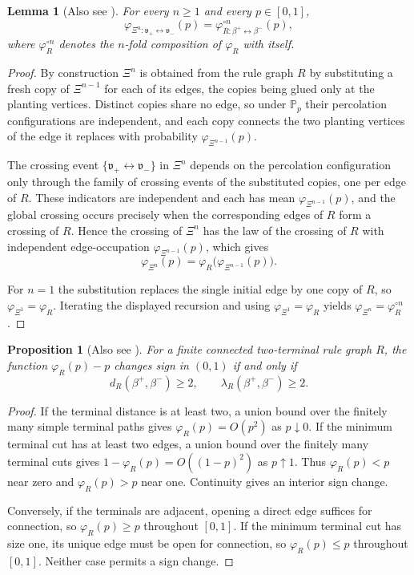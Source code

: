 \documentclass[scheme=plain,11pt]{ctexart}
\newtheorem{lemma}[theorem]{Lemma}
\newtheorem{proposition}[theorem]{Proposition}
\theoremstyle{definition}
\theoremstyle{remark}
\newcommand{\dist}{d}
\begin{document}
\begin{lemma}[Also see \cite{alves2026percolation}]\label{lem:renormalisation}
For every $n\ge 1$ and every $p\in[0,1]$,
\[
    \varphi_{\Xi^{n}:\mathfrak v_+\leftrightarrow \mathfrak v_-}(p)
    =
    \varphi_{R:\beta^+\leftrightarrow \beta^-}^{\circ n}(p),
\]
where $\varphi_R^{\circ n}$ denotes the $n$-fold composition of $\varphi_R$ with itself.
\end{lemma}
\begin{proof}
By construction $\Xi^{n}$ is obtained from the rule graph $R$ by substituting a fresh copy of $\Xi^{n-1}$ for each of its edges, the copies being glued only at the planting vertices.
Distinct copies share no edge, so under $\mathbb P_p$ their percolation configurations are independent, and each copy connects the two planting vertices of the edge it replaces with probability $\varphi_{\Xi^{n-1}}(p)$.

The crossing event $\{\mathfrak v_+\leftrightarrow\mathfrak v_-\}$ in $\Xi^{n}$ depends on the percolation configuration only through the family of crossing events of the substituted copies, one per edge of $R$.
These indicators are independent and each has mean $\varphi_{\Xi^{n-1}}(p)$, and the global crossing occurs precisely when the corresponding edges of $R$ form a crossing of $R$.
Hence the crossing of $\Xi^{n}$ has the law of the crossing of $R$ with independent edge-occupation $\varphi_{\Xi^{n-1}}(p)$, which gives
\[
    \varphi_{\Xi^{n}}(p)=\varphi_{R}\bigl(\varphi_{\Xi^{n-1}}(p)\bigr).
\]

For $n=1$ the substitution replaces the single initial edge by one copy of $R$, so $\varphi_{\Xi^{1}}=\varphi_R$.
Iterating the displayed recursion and using $\varphi_{\Xi^{1}}=\varphi_R$ yields $\varphi_{\Xi^{n}}=\varphi_R^{\circ n}$.
\end{proof}



\begin{proposition}[Also see \cite{alves2026percolation}]\label{prop:nontrivial-transition}
For a finite connected two-terminal rule graph $R$, the function $\varphi_R(p)-p$ changes sign in $(0,1)$ if and only if
\[
 \dist_R(\beta^+,\beta^-)\ge2,
 \qquad \lambda_R(\beta^+,\beta^-)\ge2.
\]
\end{proposition}
\begin{proof}
If the terminal distance is at least two, a union bound over the finitely many simple terminal paths gives $\varphi_R(p)=O(p^2)$ as $p\downarrow0$.
If the minimum terminal cut has at least two edges, a union bound over the finitely many terminal cuts gives $1-\varphi_R(p)=O((1-p)^2)$ as $p\uparrow1$.
Thus $\varphi_R(p)<p$ near zero and $\varphi_R(p)>p$ near one.
Continuity gives an interior sign change.

Conversely, if the terminals are adjacent, opening a direct edge suffices for connection, so $\varphi_R(p)\ge p$ throughout $[0,1]$.
If the minimum terminal cut has size one, its unique edge must be open for connection, so $\varphi_R(p)\le p$ throughout $[0,1]$.
Neither case permits a sign change.
\end{proof}
\end{document}
